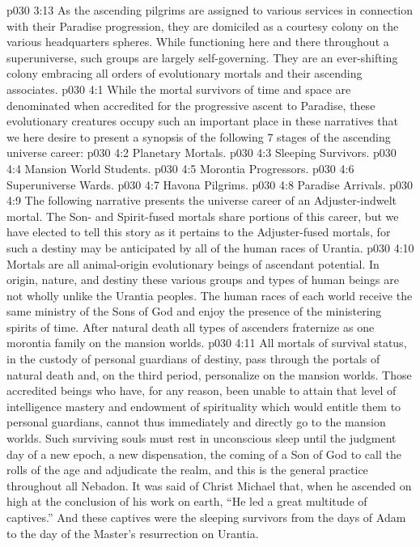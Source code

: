 \vs p030 3:13 \bibnobreakspace {} As the ascending pilgrims are assigned to various services in connection with their Paradise progression, they are domiciled as a courtesy colony on the various headquarters spheres. While functioning here and there throughout a superuniverse, such groups are largely self\hyp{}governing. They are an ever\hyp{}shifting colony embracing all orders of evolutionary mortals and their ascending associates.
\vs p030 4:1 While the mortal survivors of time and space are denominated  when accredited for the progressive ascent to Paradise, these evolutionary creatures occupy such an important place in these narratives that we here desire to present a synopsis of the following 7 stages of the ascending universe career:
\vs p030 4:2 \bibnobreakspace Planetary Mortals.
\vs p030 4:3 \bibnobreakspace Sleeping Survivors.
\vs p030 4:4 \bibnobreakspace Mansion World Students.
\vs p030 4:5 \bibnobreakspace Morontia Progressors.
\vs p030 4:6 \bibnobreakspace Superuniverse Wards.
\vs p030 4:7 \bibnobreakspace Havona Pilgrims.
\vs p030 4:8 \bibnobreakspace Paradise Arrivals.
\vs p030 4:9 \pc The following narrative presents the universe career of an Adjuster\hyp{}indwelt mortal. The Son\hyp{} and Spirit\hyp{}fused mortals share portions of this career, but we have elected to tell this story as it pertains to the Adjuster\hyp{}fused mortals, for such a destiny may be anticipated by all of the human races of Urantia.
\vs p030 4:10 \bibnobreakspace {} Mortals are all animal\hyp{}origin evolutionary beings of ascendant potential. In origin, nature, and destiny these various groups and types of human beings are not wholly unlike the Urantia peoples. The human races of each world receive the same ministry of the Sons of God and enjoy the presence of the ministering spirits of time. After natural death all types of ascenders fraternize as one morontia family on the mansion worlds.
\vs p030 4:11 \bibnobreakspace {} All mortals of survival status, in the custody of personal guardians of destiny, pass through the portals of natural death and, on the third period, personalize on the mansion worlds. Those accredited beings who have, for any reason, been unable to attain that level of intelligence mastery and endowment of spirituality which would entitle them to personal guardians, cannot thus immediately and directly go to the mansion worlds. Such surviving souls must rest in unconscious sleep until the judgment day of a new epoch, a new dispensation, the coming of a Son of God to call the rolls of the age and adjudicate the realm, and this is the general practice throughout all Nebadon. It was said of Christ Michael that, when he ascended on high at the conclusion of his work on earth, “He led a great multitude of captives.” And these captives were the sleeping survivors from the days of Adam to the day of the Master’s resurrection on Urantia.
